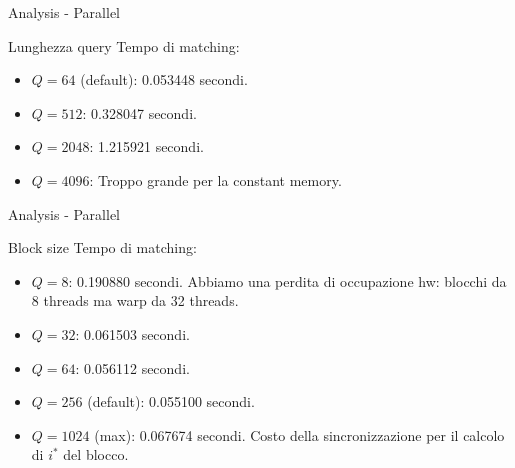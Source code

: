\begin{frame}{Analysis - Parallel}
    \begin{block}{Lunghezza query}
        Tempo di matching:
        \begin{itemize}
            \item \textbf{$Q=64$} (default): 0.053448 secondi.
            \item \textbf{$Q=512$}: 0.328047 secondi.
            \item \textbf{$Q=2048$}: 1.215921 secondi.
            \item \textbf{$Q=4096$}: Troppo grande per la constant memory.
        \end{itemize}
    \end{block}
\end{frame}

\begin{frame}{Analysis - Parallel}
    \begin{block}{Block size}
        Tempo di matching:
        \begin{itemize}
            \item \textbf{$Q=8$}: 0.190880 secondi. Abbiamo una perdita di occupazione hw: blocchi da 8 threads ma warp da 32 threads.
            \item \textbf{$Q=32$}: 0.061503 secondi.
            \item \textbf{$Q=64$}: 0.056112 secondi.
            \item \textbf{$Q=256$} (default): 0.055100 secondi.
            \item \textbf{$Q=1024$} (max): 0.067674 secondi. Costo della sincronizzazione per il calcolo di $i^*$ del blocco.
        \end{itemize}
    \end{block}
\end{frame}